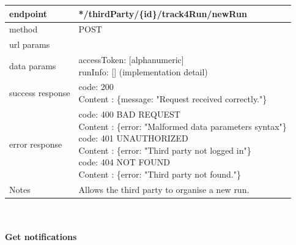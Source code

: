 \begin{legal}
\begin{legal}
\begin{itemize}
								\begin{tabularx}{\linewidth}{| l| l }
									\hline
									endpoint & */thirdParty/\{id\}/track4Run/newRun \\
									\hline
									method & POST \\
									\hline
									url params & \\
									\hline
									data params &
									\parbox{0.7\textwidth}{
										\bigskip
										accessToken: [alphanumeric]\\
										runInfo: [] (implementation detail)
										\bigskip
									} \\
									\hline
									success response &
									\parbox{0.7\textwidth}{
										\bigskip
										code: 200\\
										Content : \{message: "Request received correctly."\}
										\bigskip
									} \\
									\hline
									error response &
									\parbox{0.7\textwidth}{
										\bigskip
										code: 400 BAD REQUEST \\
										Content : \{error: "Malformed data parameters syntax"\}\\
										code: 401 UNAUTHORIZED \\
										Content : \{error: "Third party not logged in"\}\\
										code: 404 NOT FOUND \\
										Content : \{error: "Third party not found."\}
										\bigskip
									} \\
									\hline
									Notes & 
									\parbox{0.7\textwidth}{
										\bigskip Allows the third party to organise a new run.
									\bigskip}  \\
									\hline
								\end{tabularx}\\\\
							
								\textbf{Get notifications} \\
			

\end{itemize}
\end{legal}
\end{legal}
